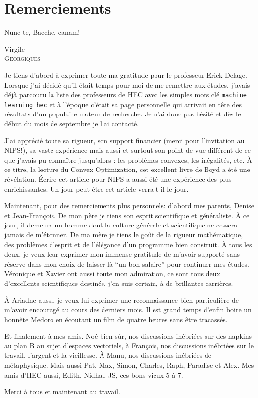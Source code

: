 \section*{Remerciements}

\epigraph{Nunc te, Bacche, canam!}{Virgile\\\textsc{Géorgiques}}

Je tiens d'abord à exprimer toute ma gratitude pour le professeur Erick Delage. Lorsque
j'ai décidé qu'il était temps pour moi de me remettre aux études, j'avais déjà parcouru la
liste des professeurs de HEC avec les simples mots clé {\small\verb+machine learning hec+}
et à l'époque c'était sa page personnelle qui arrivait en tête des résultats d'un
populaire moteur de recherche. Je n'ai donc pas hésité et dès le début du mois de
septembre je l'ai contacté.

J'ai apprécié toute sa rigueur, son support financier (merci pour l'invitation au NIPS!),
sa vaste expérience mais aussi et surtout son point de vue différent de ce que j'avais pu
connaître jusqu'alors : les problèmes convexes, les inégalités, etc. À ce titre, la
lecture du Convex Optimization, cet excellent livre de Boyd a été une révélation. Écrire
cet article pour NIPS a aussi été une expérience des plus enrichissantes. Un jour peut
être cet article verra-t-il le jour.

Maintenant, pour des remerciements plus personnels: d'abord mes parents, Denise et
Jean-François. De mon père je tiens son esprit scientifique et généraliste. À ce jour, il
demeure un homme dont la culture générale et scientifique ne cessera jamais de
m'étonner. De ma mère je tiens le goût de la rigueur mathématique, des problèmes d'esprit
et de l'élégance d'un programme bien construit. À tous les deux, je veux leur exprimer mon
immense gratitude de m'avoir supporté sans réserve dans mon choix de laisser là ``un bon
salaire'' pour continuer mes études. Véronique et Xavier ont aussi toute mon admiration,
ce sont tous deux d'excellents scientifiques destinés, j'en suis certain, à de brillantes
carrières.

À Ariadne aussi, je veux lui exprimer une reconnaissance bien particulière de m'avoir
encouragé au cours des derniers mois. Il est grand temps d'enfin boire un honnête Medoro
en écoutant un film de quatre heures sans être tracassés.

Et finalement à mes amis. Noé bien sûr, nos discussions inébriées sur des napkins au plan
B au sujet d'espaces vectoriels, à François, nos discussions inébriées sur le travail,
l'argent et la vieillesse. À Manu, nos discussions inébriées de métaphysique. Mais aussi
Pat, Max, Simon, Charles, Raph, Paradise et Alex. Mes amis d'HEC aussi, Edith, Nidhal, JS,
ces bons vieux 5 à 7.

Merci à tous et maintenant au travail. 

